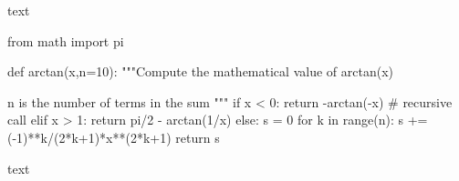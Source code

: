 \documentclass{article}
\begin{document}
text
\begin{Piton}
 from math import pi

 def arctan(x,n=10):
    """Compute the mathematical value of arctan(x)

    n is the number of terms in the sum
    """
     if x < 0:
         return -arctan(-x) # recursive call
     elif x > 1: 
         return pi/2 - arctan(1/x) 
     else: 
         s = 0
         for k in range(n):
             s += (-1)**k/(2*k+1)*x**(2*k+1)
         return s 
\end{Piton}
text
\end{document}
